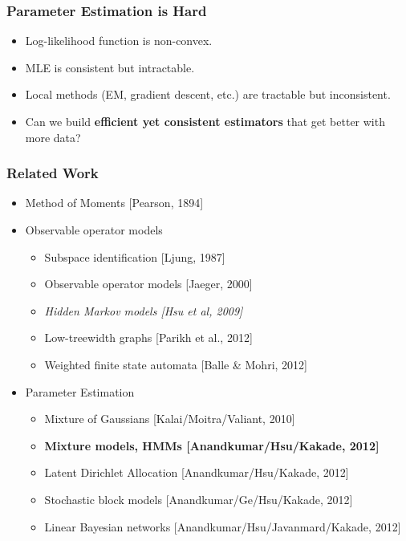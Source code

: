 \documentclass[xcolor={svgnames}]{beamer}
\begin{document}
\begin{frame}
  \frametitle{Parameter Estimation is Hard}



  \begin{itemize}
    \item<1-> Log-likelihood function is non-convex.
    \item<2-> MLE is consistent but intractable.
    \item<3-> Local methods (EM, gradient descent, etc.) are tractable but inconsistent.
    \item<4-> Can we build {\bf efficient yet consistent estimators} that get better with more data?
  \end{itemize}

\end{frame}

\begin{frame}
  \frametitle{Related Work}
  \begin{itemize}
    \item<+-> Method of Moments [Pearson, 1894]
    \item<+-> Observable operator models
    \begin{itemize}
      \item Subspace identification [Ljung, 1987]
      \item Observable operator models [Jaeger, 2000]
      \item {\em Hidden Markov models [Hsu et al, 2009]}
      \item Low-treewidth graphs [Parikh et al., 2012]
      \item Weighted finite state automata [Balle \& Mohri, 2012]
    \end{itemize}
     \item<+-> Parameter Estimation
  \begin{itemize}
    \item Mixture of Gaussians [Kalai/Moitra/Valiant, 2010]
    \item {\bf Mixture models, HMMs [Anandkumar/Hsu/Kakade, 2012]}
    \item Latent Dirichlet Allocation [Anandkumar/Hsu/Kakade, 2012]
    \item Stochastic block models [Anandkumar/Ge/Hsu/Kakade, 2012]
    \item Linear Bayesian networks [Anandkumar/Hsu/Javanmard/Kakade, 2012]
  \end{itemize}
  \end{itemize}
\end{frame}
\end{document}
